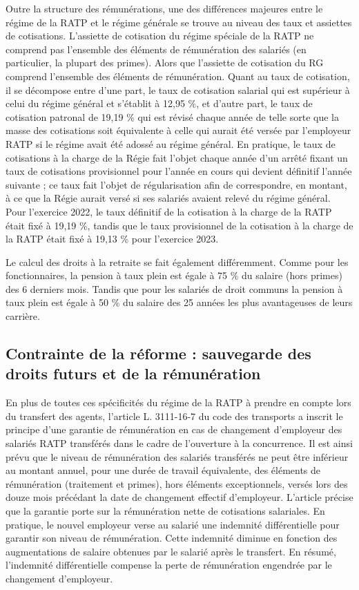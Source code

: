 Outre la structure des rémunérations, une des différences majeures entre le régime de la RATP et le régime générale se trouve au niveau des taux et assiettes de cotisations.
L'assiette de cotisation du régime spéciale de la RATP ne comprend pas l’ensemble des éléments de rémunération des salariés (en particulier, la plupart des primes). Alors que l'assiette de cotisation du RG comprend l'ensemble des éléments de rémunération.
Quant au taux de cotisation, il se décompose entre d’une part, le taux de cotisation salarial qui est supérieur à celui du régime général et s’établit à 12,95 \%, et d’autre part, le taux de cotisation patronal de 19,19 \% qui est révisé chaque année de telle sorte que la masse des cotisations soit équivalente à celle qui aurait été versée par l’employeur RATP si le régime avait été adossé au régime général. En pratique, le taux de cotisations à la charge de la Régie fait l’objet chaque année d’un arrêté fixant un taux de cotisations provisionnel pour l’année en cours qui devient définitif l’année suivante ; ce taux fait l’objet de régularisation afin de correspondre, en montant, à ce que la Régie aurait versé si ses salariés avaient relevé du régime général. Pour l’exercice 2022, le taux définitif de la cotisation à la charge de la RATP était fixé à 19,19 \%, tandis que le taux provisionnel de la cotisation à la charge de la RATP était fixé à 19,13 \% pour l’exercice 2023.  

Le calcul des droits à la retraite se fait également différemment. Comme pour les fonctionnaires, la pension à taux plein est égale à 75 \% du salaire (hors primes) des 6 derniers mois. Tandis que pour les salariés de droit communs la pension à taux plein est égale à 50 \% du salaire des 25 années les plus avantageuses de leurs carrière.


\subsection{Contrainte de la réforme : sauvegarde des droits futurs et de la rémunération}

En plus de toutes ces spécificités du régime de la RATP à prendre en compte lors du transfert des agents, l’article L. 3111-16-7 du code des transports a inscrit le principe d’une garantie de rémunération en cas de changement d’employeur des salariés RATP transférés dans le cadre de l’ouverture à la concurrence. Il est ainsi prévu que le niveau de rémunération des salariés transférés ne peut être inférieur au montant annuel, pour une durée de travail équivalente, des éléments de rémunération (traitement et primes), hors éléments exceptionnels, versés lors des douze mois précédant la date de changement effectif d’employeur. L’article précise que la garantie porte sur la rémunération nette de cotisations salariales. En pratique, le nouvel employeur verse au salarié une indemnité différentielle pour garantir son niveau de rémunération. Cette indemnité diminue en fonction des augmentations de salaire obtenues par le salarié après le transfert. En résumé, l'indemnité différentielle compense la perte de rémunération engendrée par le changement d’employeur.


